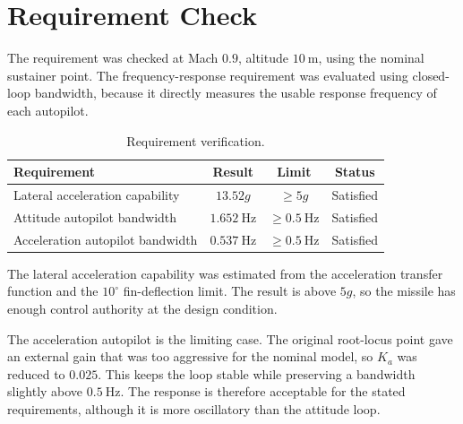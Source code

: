 \section{Requirement Check}

The requirement was checked at Mach \(0.9\), altitude \(10~\text{m}\), using the nominal sustainer point. The frequency-response requirement was evaluated using closed-loop bandwidth, because it directly measures the usable response frequency of each autopilot.

\begin{table}[H]
\centering
\caption{Requirement verification.}
\begin{tabular}{lccc}
\toprule
Requirement & Result & Limit & Status \\
\midrule
Lateral acceleration capability & \(13.52g\) & \(\geq 5g\) & Satisfied \\
Attitude autopilot bandwidth & \(1.652~\text{Hz}\) & \(\geq 0.5~\text{Hz}\) & Satisfied \\
Acceleration autopilot bandwidth & \(0.537~\text{Hz}\) & \(\geq 0.5~\text{Hz}\) & Satisfied \\
\bottomrule
\end{tabular}
\end{table}

The lateral acceleration capability was estimated from the acceleration transfer function and the \(10^\circ\) fin-deflection limit. The result is above \(5g\), so the missile has enough control authority at the design condition.

The acceleration autopilot is the limiting case. The original root-locus point gave an external gain that was too aggressive for the nominal model, so \(K_a\) was reduced to \(0.025\). This keeps the loop stable while preserving a bandwidth slightly above \(0.5~\text{Hz}\). The response is therefore acceptable for the stated requirements, although it is more oscillatory than the attitude loop.
